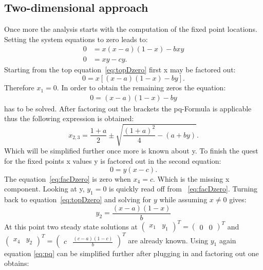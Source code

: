 \subsection{Two-dimensional approach}
Once more the analysis starts with the computation of the fixed point locations. Setting the system equations to zero leads to:
\begin{align}
0 &= x(x-a)(1-x) - bxy \\
\label{eq:topDzero}
0 &= xy - cy.
\end{align}
Starting from the top equation~\ref{eq:topDzero} first x may be factored out:
\begin{equation}
0 = x[(x-a)(1-x) - by].
\end{equation}
Therefore $x_1 = 0$. In order to obtain the remaining zeros the equation:
\begin{align}
0 = (x - a)(1 - x) - by
\end{align} 
has to be solved. After factoring out the brackets the pq-Formula is applicable thus the following expression is obtained:
\begin{equation}
x_{2,3} = \frac{1+a}{2} \pm \sqrt{\frac{(1+a)^2}{4} - (a + by)}.
\label{eq:pq}
\end{equation}
Which will be simplified further once more is known about y. To finish the quest for the fixed points x values y is factored out in the second equation:
\begin{equation}
0 = y (x - c).
\label{eq:facDzero}
\end{equation}
The equation~\ref{eq:facDzero} is zero when $x_4 = c$. Which is the missing x component. Looking at y, $y_1 = 0$ is quickly read off from ~\ref{eq:facDzero}. Turning back to equation~\ref{eq:topDzero} and solving for $y$ while assuming $x \ne 0$ gives:
\begin{equation}
y_2 = \frac{(x - a)(1 - x)}{b}
\end{equation}
At this point two steady state solutions at $\begin{pmatrix} x_1 & y_1 \end{pmatrix}^T = \begin{pmatrix} 0 & 0 \end{pmatrix}^T$ and $\begin{pmatrix} x_4 & y_2 \end{pmatrix}^T = \begin{pmatrix} c & \frac{(c -a )(1-c)}{b} \end{pmatrix}^T$ are already known. Using $y_1$ again equation \ref{eq:pq} can be simplified further after plugging in and factoring out one obtains:
